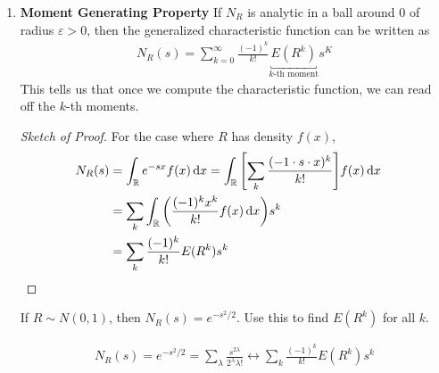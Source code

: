 \begin{enumerate}
\begin{proof}
        \begin{align}
            M_R(u + 2\pi) = \sum_{x \in R} e^{-iux} e^{2\pi i u} p_x
        \end{align}
        Since $u \in \integer$, this becomes
        \begin{align}
            M_R(u + 2\pi) = \sum_{x \in R} e^{-iux} p_x = M_R(u)
        \end{align}
    \end{proof}
    \begin{aside}
        For $R$ discrete r.v., the coefficients $p_n$ are the Fourier coefficients of the function $M_R(u)$.
        \begin{align}
            p_n = \frac{1}{2\pi} \int_0^{2\pi} e^{iun} M_R(u) \dd{u}
        \end{align}
    \end{aside}
    \item \textbf{Moment Generating Property} If $N_R$ is analytic in a ball around $0$ of radius $\varepsilon > 0$, then the generalized characteristic function can be written as
    \begin{align}
        N_R(s) = \sum_{k=0}^\infty \frac{(-1)^k}{k!} \underbracket{E(R^k)}_{\text{$k$-th moment}} s^K
    \end{align}
    This tells us that once we compute the characteristic function, we can read off the $k$-th moments.
    \begin{proof}[Sketch of Proof]
        For the case where $R$ has density $f(x)$,
        \begin{align}
            N_R(s)
            &= \int_{\mathbb{R}} e^{-sx} f(x) \dd{x} = \int_{\mathbb{R}} \qty[\sum_k \frac{(-1 \cdot s \cdot x)^k}{k!}] f(x) \dd{x}\\
            &= \sum_k \int_{\mathbb{R}} \qty(\frac{(-1)^k x^k}{k!} f(x) \dd{x}) s^k\\
            &= \sum_k \frac{(-1)^k}{k!} E(R^k) s^k & \qedhere
        \end{align}
    \end{proof}
    \begin{example}
        If $R \sim N(0,1)$, then $N_R(s) = e^{-s^2/2}$. Use this to find $E(R^k)$ for all $k$.
    \end{example}
    \begin{solution}
        \begin{align}
            N_R(s) = e^{-s^2/2} = \sum_\lambda \frac{s^{2\lambda}}{2^\lambda \lambda!} \leftrightarrow \sum_k \frac{(-1)^k}{k!} E(R^k) s^k
        \end{align}

\end{solution}
\end{enumerate}
